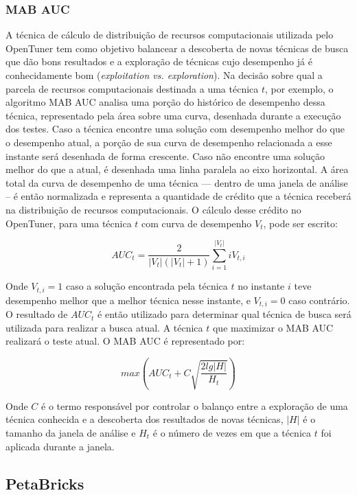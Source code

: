 \documentclass[a4paper, 11pt]{article}
\begin{document}
\subsubsection{MAB AUC}

A técnica de cálculo de distribuição de recursos computacionais utilizada
pelo OpenTuner tem como objetivo balancear a descoberta de novas técnicas
de busca que dão bons resultados e a exploração de técnicas cujo desempenho
já é conhecidamente bom (\emph{exploitation vs. exploration}). Na decisão sobre
qual a parcela de recursos computacionais destinada a uma técnica $t$, por
exemplo, o algoritmo MAB AUC analisa uma porção do histórico de desempenho 
dessa técnica, representado pela área sobre uma curva, desenhada durante a
execução dos testes. Caso a técnica encontre uma solução com desempenho melhor
do que o desempenho atual, a porção de sua curva de desempenho relacionada a
esse instante será desenhada de forma crescente. Caso não encontre uma solução
melhor do que a atual, é desenhada uma linha paralela ao eixo horizontal. A
área total da curva de desempenho de uma técnica --- dentro de uma janela de
análise -- é então normalizada e representa a quantidade de crédito que a 
técnica receberá na distribuição de recursos computacionais. O cálculo desse 
crédito no OpenTuner, para uma técnica $t$ com curva de desempenho $V_t$, pode
ser escrito:

\begin{equation*}
    AUC_t = \frac{2} {|V_t|(|V_t|+1)} \sum_{i=1}^{|V_t|} iV_{t,i}
\end{equation*}

Onde $V_{t,i} = 1$ caso a solução encontrada pela técnica $t$ no instante
$i$ teve desempenho melhor que a melhor técnica nesse instante, e 
$V_{t,i} = 0$ caso contrário. O resultado de $AUC_t$ é então utilizado para
determinar qual técnica de busca será utilizada para realizar a busca atual.
A técnica $t$ que maximizar o MAB AUC realizará o teste atual. O MAB AUC é
representado por:

\begin{equation*}
    max (AUC_t + C\sqrt{\frac{2lg|H|}{H_t}})
\end{equation*}

Onde $C$ é o termo responsável por controlar o balanço entre a exploração de 
uma técnica conhecida e a descoberta dos resultados de novas técnicas, $|H|$ é
o tamanho da janela de análise e $H_t$ é o número de vezes em que a técnica $t$
foi aplicada durante a janela.

\subsection{PetaBricks} \label{sec:peta}
\end{document}
